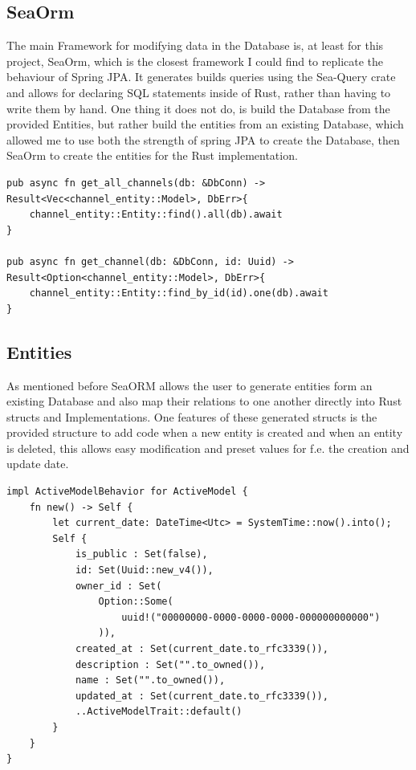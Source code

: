 \documentclass[a4paper,12pt]{article}
\begin{document}
	\subsection{SeaOrm}
	\label{subsec:sea_orm}
	The main Framework for modifying data in the Database is, at least for this project, SeaOrm, which
	is the closest framework I could find to replicate the behaviour of Spring JPA. It generates 
	builds queries using the Sea-Query crate and allows for declaring SQL statements inside of Rust,
	rather than having to write them by hand. One thing it does not do, is build the Database from the
	provided Entities, but rather build the entities from an existing Database, which allowed me to
	use both the strength of spring JPA to create the Database, then SeaOrm to create the entities
	for the Rust implementation.
	\begin{lstlisting}
pub async fn get_all_channels(db: &DbConn) -> Result<Vec<channel_entity::Model>, DbErr>{
    channel_entity::Entity::find().all(db).await
}

pub async fn get_channel(db: &DbConn, id: Uuid) -> Result<Option<channel_entity::Model>, DbErr>{
    channel_entity::Entity::find_by_id(id).one(db).await
}
	\end{lstlisting}
	
	\subsection*{Entities}
	As mentioned before SeaORM allows the user to generate entities form an existing Database and
	also map their relations to one another directly into Rust structs and Implementations. One
	features of these generated structs is the provided structure to add code when a new entity is
	created and when an entity is deleted, this allows easy modification and preset values for f.e.
	the creation and update date.

	\begin{lstlisting}
impl ActiveModelBehavior for ActiveModel {
    fn new() -> Self {
        let current_date: DateTime<Utc> = SystemTime::now().into();
        Self {
            is_public : Set(false),
            id: Set(Uuid::new_v4()),
            owner_id : Set(
				Option::Some(
					uuid!("00000000-0000-0000-0000-000000000000")
				)),
            created_at : Set(current_date.to_rfc3339()),
            description : Set("".to_owned()),
            name : Set("".to_owned()),
            updated_at : Set(current_date.to_rfc3339()),
            ..ActiveModelTrait::default()
        }
    }
}
	\end{lstlisting}
\end{document}
